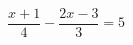 \begin{ex}[type=equation]
	\begin{condition}
		$\dfrac{x+1}{4}-\dfrac{2x - 3}{3}=5$
	\end{condition}
\end{ex}